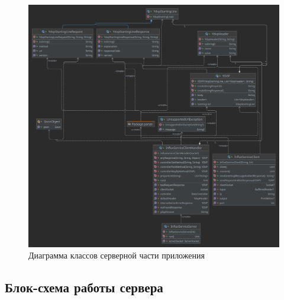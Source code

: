 \begin{figure}[hbtp]
	\centering
	\includegraphics[width=\textwidth]{img/serverDiagram.png}
	\caption{Диаграмма классов серверной части приложения}
	\label{fig:serverAndProtocol}
\end{figure}
\pagebreak

\subsection{Блок-схема работы сервера}
\pagebreak